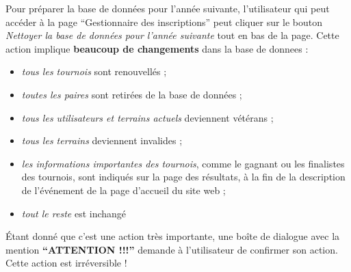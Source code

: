 Pour préparer la base de données pour l'année suivante, l'utilisateur qui peut accéder à la page \enquote{Gestionnaire des inscriptions} peut cliquer sur le bouton \textit{Nettoyer la base de données pour l'année suivante} tout en bas de la page. Cette action implique \textbf{beaucoup de changements} dans la base de donnees :

\begin{itemize}
\item \textit{tous les tournois} sont renouvellés ;
\item \textit{toutes les paires} sont retirées de la base de données ;
\item \textit{tous les utilisateurs et terrains actuels} deviennent vétérans ;
\item \textit{tous les terrains} deviennent invalides ;
\item \textit{les informations importantes des tournois}, comme le gagnant ou les finalistes des tournois, sont indiqués sur la page des résultats, à la fin de la description de l'événement de la page d'accueil du site web ;
\item \textit{tout le reste} est inchangé
\end{itemize}
\bigskip

Étant donné que c'est une action très importante, une boîte de dialogue avec la mention \textbf{\enquote{ATTENTION !!!}} demande à l'utilisateur de confirmer son action. Cette action est irréversible !